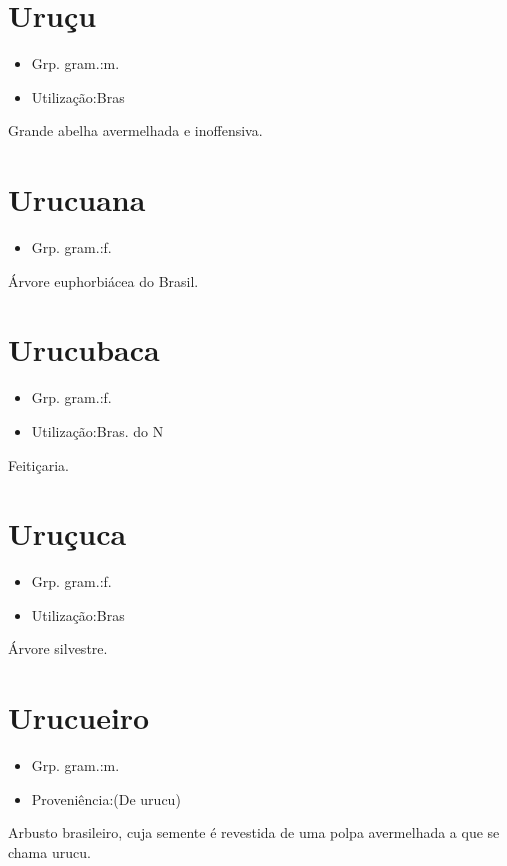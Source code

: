 \documentclass{article}
\begin{document}
\section{Uruçu}
\begin{itemize}
\item {Grp. gram.:m.}
\end{itemize}
\begin{itemize}
\item {Utilização:Bras}
\end{itemize}
Grande abelha avermelhada e inoffensiva.
\section{Urucuana}
\begin{itemize}
\item {Grp. gram.:f.}
\end{itemize}
Árvore euphorbiácea do Brasil.
\section{Urucubaca}
\begin{itemize}
\item {Grp. gram.:f.}
\end{itemize}
\begin{itemize}
\item {Utilização:Bras. do N}
\end{itemize}
Feitiçaria.
\section{Uruçuca}
\begin{itemize}
\item {Grp. gram.:f.}
\end{itemize}
\begin{itemize}
\item {Utilização:Bras}
\end{itemize}
Árvore silvestre.
\section{Urucueiro}
\begin{itemize}
\item {Grp. gram.:m.}
\end{itemize}
\begin{itemize}
\item {Proveniência:(De \textunderscore urucu\textunderscore )}
\end{itemize}
Arbusto brasileiro, cuja semente é revestida de uma polpa avermelhada a que se chama urucu.
\end{document}
